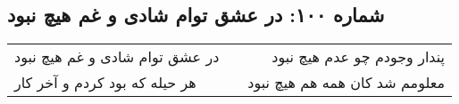 \begin{center}
\section*{شماره ۱۰۰: در عشق توام شادی و غم هیچ نبود}
\label{sec:100}
\begin{longtable}{l p{0.5cm} r}
در عشق توام شادی و غم هیچ نبود
&&
پندار وجودم چو عدم هیچ نبود
\\
هر حیله که بود کردم و آخر کار
&&
معلومم شد کان همه هم هیچ نبود
\\
\end{longtable}
\end{center}
